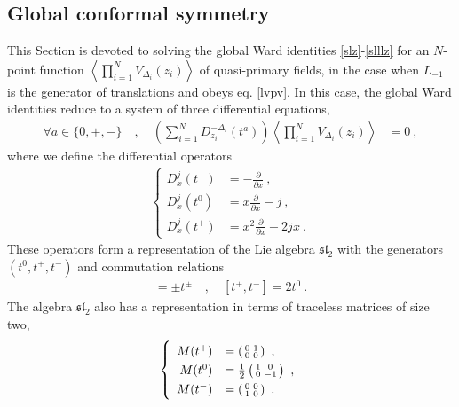 \documentclass[12pt, a4paper, notitlepage, twoside]{report}
\numberwithin{equation}{section}
\theoremstyle{break}
\begin{document}
\subsection{Global conformal symmetry \label{secgcs}}

This Section is devoted to solving the global Ward identities \eqref{slz}-\eqref{slllz} for an $N$-point function $\left\langle \prod_{i=1}^N V_{\Delta_i}(z_i)\right\rangle$ of quasi-primary fields, in the case when $L_{-1}$ is the generator of translations and obeys eq. \eqref{lvpv}. 
In this case, the global Ward identities reduce to a system of three differential equations, 
\begin{align}
\forall a \in \{0,+,-\}\quad , \quad 
 \left(\sum_{i=1}^N D_{z_i}^{-\Delta_i}(t^a)\right) \left\langle \prod_{i=1}^N V_{\Delta_i}(z_i)\right\rangle & = 0\ ,
\label{spz}
\end{align}
where we define the differential operators
\begin{align}
 \left\{ \begin{array}{rl} D_x^{j}(t^-) & = -{\frac{\partial}{\partial x}}\ ,
\\
D_x^{j}(t^0) &  = x{\frac{\partial}{\partial x}} -j\ ,
\\
D_x^{j}(t^+) & = x^2{\frac{\partial}{\partial x}} - 2j x \ .
\end{array}\right. 
\label{ddz}
\end{align}
These operators form a representation of the Lie algebra \textbf{\boldmath $\mathfrak{sl}_2$}  with the generators $(t^0,t^+,t^-)$ and commutation relations 
\begin{align}
 [t^0,t^\pm ] =\pm t^\pm \quad , \quad [t^+,t^-]=2t^0\ .
\label{ttpm}
\end{align}
The algebra $\mathfrak{sl}_2$ also has a representation in terms of traceless matrices of size two,
\begin{align}
\renewcommand{\arraystretch}{1.3}
\left\{ \begin{array}{rl}
 M(t^+)& = \left(\begin{smallmatrix} 0 & 1 \\ 0& 0 \end{smallmatrix} \right) \ , 
\\
 M(t^0) &= \frac12\left(\begin{smallmatrix} 1 & 0 \\ 0 & -1 \end{smallmatrix}\right)\ ,
\\
M(t^-) & = \left(\begin{smallmatrix} 0 & 0 \\ 1 & 0 \end{smallmatrix} \right) \ .
\end{array} \right.
\label{mta}
\end{align}
\end{document}
